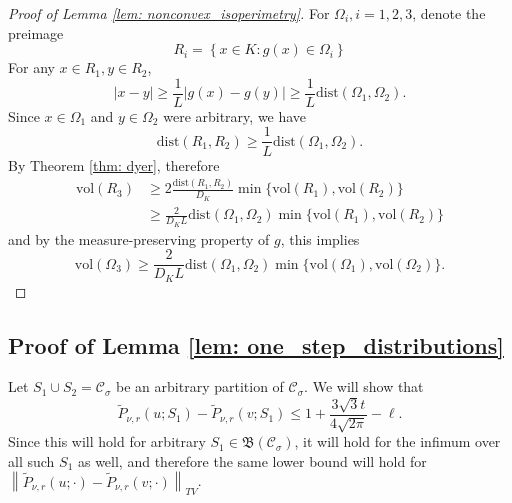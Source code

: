 \documentclass{article}
\newcommand{\norm}[1]{\left\lVert#1\right\rVert}
\newcommand{\abs}[1]{\left \lvert #1 \right \rvert}
\newcommand{\vol}{\mathrm{vol}}
\newcommand{\set}[1]{\left\{#1\right\}}
\newcommand{\dist}{\mathrm{dist}}
\newcommand{\Cset}{\mathcal{C}}
\newcommand{\Csig}{\Cset_{\sigma}}
\newcommand{\1}{\mathbf{1}}
\theoremstyle{alden}
\theoremstyle{aldenthm}
\theoremstyle{remark}
\begin{document}
\begin{proof}[Proof of Lemma \ref{lem: nonconvex_isoperimetry}]
	For $\Omega_i, i = 1,2,3$, denote the preimage
	\begin{equation*}
	R_i = \set{x \in K: g(x) \in \Omega_i}
	\end{equation*}
	For any $x \in R_1, y \in R_2$, 
	\begin{equation*}
	\abs{x - y} \geq \frac{1}{L}\abs{g(x) - g(y)} \geq \frac{1}{L} \dist(\Omega_1, \Omega_2). 
	\end{equation*}
	Since $x \in \Omega_1$ and $y \in \Omega_2$ were arbitrary, we have
	\begin{equation*}
	\dist(R_1, R_2) \geq \frac{1}{L} \dist(\Omega_1, \Omega_2).
	\end{equation*}
	By Theorem \ref{thm: dyer}, therefore
	\begin{align*}
	\vol(R_3) & \geq 2\frac{\dist(R_1, R_2)}{D_{K}} \min \{\vol(R_1), \vol(R_2)\} \\
	& \geq \frac{2}{D_{K} L} \dist(\Omega_1, \Omega_2) \min\{\vol(R_1), \vol(R_2)\}
	\end{align*}
	and by the measure-preserving property of $g$, this implies
	\begin{equation*}
	\vol(\Omega_3) \geq\frac{2}{D_{K} L} \dist(\Omega_1, \Omega_2) \min\{\vol(\Omega_1), \vol(\Omega_2)\}.
	\end{equation*}
\end{proof}

\subsection{Proof of Lemma \ref{lem: one_step_distributions}}
	Let $S_1 \cup S_2 = \Csig$ be an arbitrary partition of $\Csig$. We will show that 
	\begin{equation*}
	\widetilde{P}_{\nu,r}(u; S_1) - \widetilde{P}_{\nu,r}(v; S_1) \leq 1 + \frac{3 \sqrt{3} t}{4\sqrt{2\pi}} - \ell.
	\end{equation*}
	Since this will hold for arbitrary $S_1 \in \mathfrak{B}(\Csig)$, it will hold for the infimum over all such $S_1$ as well, and therefore the same lower bound will hold for $\norm{\widetilde{P}_{\nu,r}(u; \cdot) - \widetilde{P}_{\nu,r}(v; \cdot)}_{TV}$.
	
\end{document}

